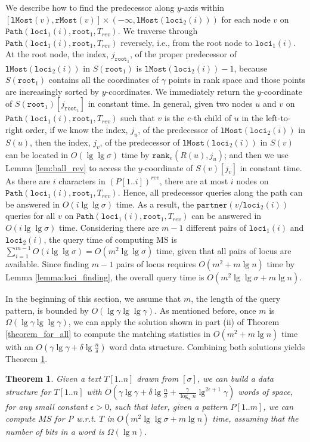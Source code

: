 \documentclass[smallabstract,smallcaptions]{dccpaper}
\newtheorem{theorem}{Theorem}
\def\idtt#1{\ensuremath{\mathtt{#1}}}
\def\partner{\idtt{partner}}
\def\path{\idtt{Path}}
\def\loci{\idtt{loci}}
\def\lMost{\idtt{lMost}}
\def\rMost{\idtt{rMost}}
\def\rank{\idtt{rank}}
\def\root{\idtt{root}}
\begin{document}
We describe how to find the predecessor along $y$-axis within $[\lMost(v), \rMost(v)]\times(-\infty, \lMost(\loci_2(i)))$ for each node $v$ on $\path(\loci_1(i), \root_1, T_{rev})$.
We traverse through $\path(\loci_1(i), \root_1, T_{rev})$ reversely, i.e., from the root node to $\loci_1(i)$.
At the root node, the index, $j_{\root_1}$, of the proper predecessor of $\lMost(\loci_2(i))$ in $S(\root_1)$ is $\lMost(\loci_2(i))-1$, because $S(\root_1)$ contains all the coordinates of $\gamma$ points in rank space and those points are increasingly sorted by $y$-coordinates.
We immediately return the $y$-coordinate of $S(\root_1)[j_{\root_1}]$ in constant time.
In general, given two nodes $u$ and $v$ on $\path(\loci_1(i), \root_1, T_{rev})$ such that $v$ is the $e$-th child of $u$ in the left-to-right order, if we know the index, $j_u$, of the predecessor of $\lMost(\loci_2(i))$ in $S(u)$, then the index, $j_v$, of the predecessor of $\lMost(\loci_2(i))$ in $S(v)$ can be located in $O(\lg \lg \sigma)$ time by $\rank_e(R(u), j_u)$; and then we use Lemma \ref{lem:ball_rev} to access the $y$-coordinate of $S(v)[j_v]$ in constant time.
As there are $i$ characters in $(P[1..i])^{rev}$, there are at most $i$ nodes on $\path(\loci_1(i), \root_1, T_{rev})$.
Hence, all predecessor queries along the path can be answered in $O(i \lg \lg \sigma)$ time.
As a result, the $\partner(v/\loci_2(i))$ queries for all $v$ on $\path(\loci_1(i), \root_1, T_{rev})$ can be answered in $O(i \lg \lg \sigma)$ time.
Considering there are $m-1$ different pairs of $\loci_1(i)$ and $\loci_2(i)$, the query time of computing MS is $\sum_{i=1}^{m-1}O(i\lg \lg \sigma)=O(m^2\lg \lg \sigma)$ time, given that all pairs of locus are available.
Since finding $m-1$ pairs of locus requires $O(m^2+m\lg n)$ time by Lemma \ref{lemma:loci_finding}, the overall query time is $O(m^2 \lg \lg \sigma+m\lg n)$.

In the beginning of this section, we assume that $m$, the length of the query pattern, is bounded by $O(\lg \gamma \lg \lg \gamma)$.
As mentioned before, once $m$ is $\Omega(\lg \gamma \lg \lg \gamma)$, we can apply the solution shown in part (ii) of Theorem \ref{theorem_for_all} to compute the matching statistics in $O(m^2+m\lg n)$ time with an $O(\gamma \lg \gamma + \delta \lg \frac{n}{\delta})$ word data structure. 
Combining both solutions yields Theorem \ref{theorem_gamma: MS_2}.

\begin{theorem}
	\label{theorem_gamma: MS_2}
	Given a text $T[1..n]$ drawn from $[\sigma]$, we can build a data structure for $T[1..n]$ with $O(\gamma \lg \gamma + \delta \lg \frac{n}{\delta} + \frac{\gamma}{\log_\sigma n}\lg^{2\epsilon+1} \gamma)$ words of space, for any small constant $\epsilon>0$, such that later, given a pattern $P[1..m]$, we can compute $MS$ for P w.r.t. $T$ in $O(m^2 \lg \lg \sigma + m\lg n)$ time, assuming that the number of bits in a word is $\Omega(\lg n)$.
\end{theorem}
\end{document}
